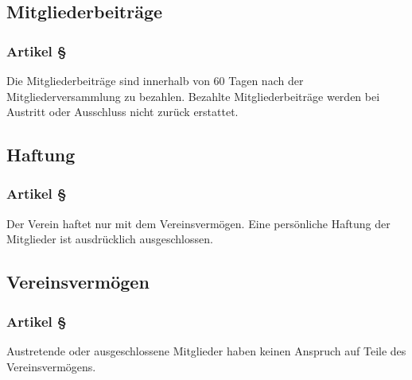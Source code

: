 \subsection{Mitgliederbeiträge}

\subsubsection*{Artikel §\articlenumber}
Die Mitgliederbeiträge sind innerhalb von 60 Tagen nach der 
Mitgliederversammlung zu bezahlen.
Bezahlte Mitgliederbeiträge werden bei Austritt oder 
Ausschluss nicht zurück erstattet.

\subsection{Haftung}

\subsubsection*{Artikel §\articlenumber}
Der Verein haftet nur mit dem Vereinsvermögen. Eine
persönliche Haftung der Mitglieder ist ausdrücklich
ausgeschlossen.

\subsection{Vereinsvermögen}

\subsubsection*{Artikel §\articlenumber}
Austretende oder ausgeschlossene Mitglieder haben keinen 
Anspruch auf Teile des Vereinsvermögens.
